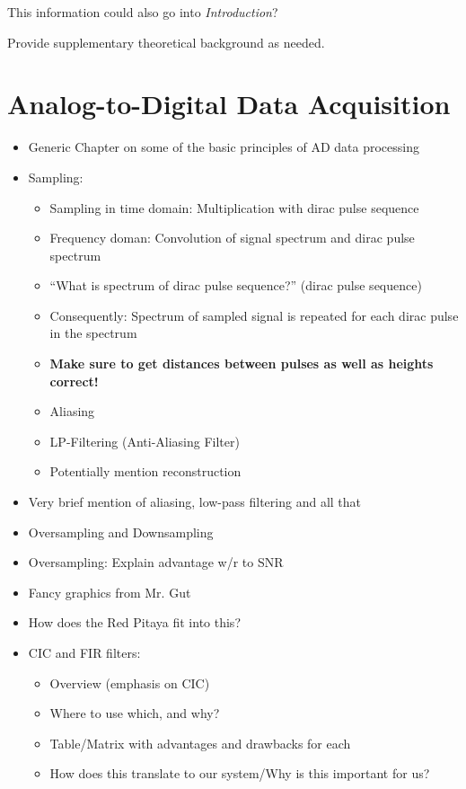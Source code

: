 \documentclass[a4paper,oneside]{alpenthesis/alpenthesis}
\begin{document}
This information could also go into \emph{Introduction}?

Provide supplementary theoretical background as needed.


\chapter{Analog-to-Digital Data Acquisition} %
\label{ch:analog-to-digital_data_aquisition}

\begin{itemize}
    \item
    Generic Chapter on some of the basic principles of AD data processing
    \item
    Sampling:
        \begin{itemize}
            \item
            Sampling in time domain: Multiplication with dirac pulse sequence
            \item
            Frequency doman: Convolution of signal spectrum and dirac pulse spectrum
            \item
            ``What is spectrum of dirac pulse sequence?'' (dirac pulse sequence)
            \item
            Consequently: Spectrum of sampled signal is repeated for each dirac pulse in the spectrum
            \item
            \textbf{Make sure to get distances between pulses as well as heights correct!}
            \item
            Aliasing
            \item
            LP-Filtering (Anti-Aliasing Filter)
            \item
            Potentially mention reconstruction
        \end{itemize}
    \item 
    Very brief mention of aliasing, low-pass filtering and all that
    \item
    Oversampling and Downsampling
    \item
    Oversampling: Explain advantage w/r to SNR
    \item
    Fancy graphics from Mr. Gut
    \item
    How does the Red Pitaya fit into this?
    \item
    CIC and FIR filters:
        \begin{itemize}
            \item
            Overview (emphasis on CIC)
            \item
            Where to use which, and why?
            \item
            Table/Matrix with advantages and drawbacks for each
            \item
            How does this translate to our system/Why is this important for us?
        \end{itemize}
\end{itemize}
\end{document}
